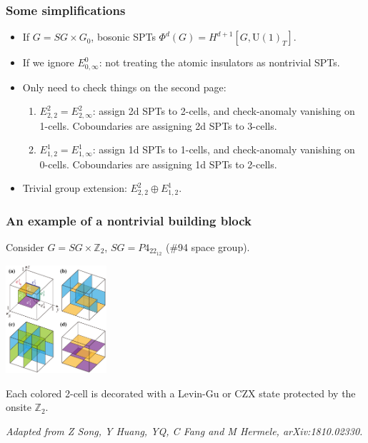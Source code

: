 \documentclass[xcolor=table, 11pt, aspectratio=169]{beamer}
\newcommand{\uone}{\mathrm U(1)}
\begin{document}
\begin{frame}
\frametitle{Some simplifications}
\begin{itemize}
\item If $G = SG\times G_0$, bosonic SPTs $\Phi^d(G)=H^{d+1}[G,\uone_T]$.
\item If we ignore $E^0_{0,\infty}$: not treating the atomic insulators as nontrivial SPTs.
\item Only need to check things on the second page:
\begin{enumerate}
\item $E^2_{2,2} = E^2_{2,\infty}$: assign 2d SPTs to 2-cells, and check-anomaly vanishing on 1-cells. Coboundaries are assigning 2d SPTs to 3-cells.
\item $E^1_{1,2} = E^1_{1,\infty}$: assign 1d SPTs to 1-cells, and check-anomaly vanishing on 0-cells. Coboundaries are assigning 1d SPTs to 2-cells.
\end{enumerate}
\item Trivial group extension: $E^2_{2,2} \oplus E^1_{1,2}$.
\end{itemize}
\end{frame}

\begin{frame}
\frametitle{An example of a nontrivial building block}
Consider $G=SG\times\mathbb Z_2$, $SG=P4_22_12$ (\#94 space group).
\begin{center}
\includegraphics[height=4cm]{blocks}
\end{center}
Each colored 2-cell is decorated with a Levin-Gu or CZX state protected by the onsite $\mathbb Z_2$.

\emph{\small Adapted from Z Song, Y Huang, YQ, C Fang and M Hermele, arXiv:1810.02330.}
\end{frame}
\end{document}
